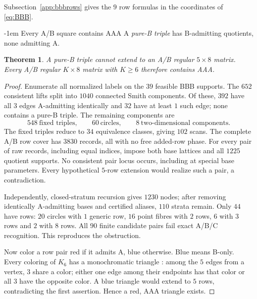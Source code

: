 \documentclass[11pt,a4paper]{article}
\makeatletter
\newtheorem{theorem}{Theorem}[section]
\theoremstyle{plain}
\theoremstyle{definition}
\numberwithin{equation}{section}
\renewcommand\subsection{\@startsection{subsection}{2}{\z@}  {\medskipamount}  {-1em}  {\normalfont\normalsize\bfseries}}
\makeatother
\begin{document}
Subsection~\ref{app:bbbrows} gives the $9$ row formulas in the coordinates of \eqref{eq:BBB}.

\subsection{Every A/B square contains AAA}\label{sec:ABhasAAA}
A \emph{pure-B triple} has B-admitting quotients, none admitting A.
\begin{theorem}\label{thm:pureBno5}\label{cor:ABAAA}
A pure-B triple cannot extend to an A/B regular $5\times8$ matrix. Every A/B regular $K\times8$ matrix with $K\ge6$ therefore contains AAA.
\end{theorem}
\begin{proof}
Enumerate all normalized labels on the $39$ feasible BBB supports. The $652$ consistent lifts split into $1040$ connected Smith components. Of these, $392$ have all $3$ edges A-admitting identically and $32$ have at least $1$ such edge; none contains a pure-B triple. The remaining components are
$$
 548\ \text{fixed triples},\qquad
 60\ \text{circles},\qquad
 8\ \text{two-dimensional components}.
$$
The fixed triples reduce to $34$ equivalence classes, giving $102$ scans. The complete A/B row cover has $3830$ records, all with no free added-row phase. For every pair of raw records, including equal indices, impose both base lattices and all $1225$ quotient supports. No consistent pair locus occurs, including at special base parameters. Every hypothetical $5$-row extension would realize such a pair, a contradiction.

Independently, closed-stratum recursion gives $1230$ nodes; after removing identically A-admitting bases and certified aliases, $110$ strata remain. Only $44$ have rows: $20$ circles with $1$ generic row, $16$ point fibres with $2$ rows, $6$ with $3$ rows and $2$ with $8$ rows. All $90$ finite candidate pairs fail exact A/B/C recognition. This reproduces the obstruction.

Now color a row pair red if it admits A, blue otherwise. Blue means B-only. Every coloring of $K_6$ has a monochromatic triangle \cite{Ramsey}: among the $5$ edges from a vertex, $3$ share a color; either one edge among their endpoints has that color or all $3$ have the opposite color. A blue triangle would extend to $5$ rows, contradicting the first assertion. Hence a red, AAA triangle exists.
\end{proof}
\end{document}
